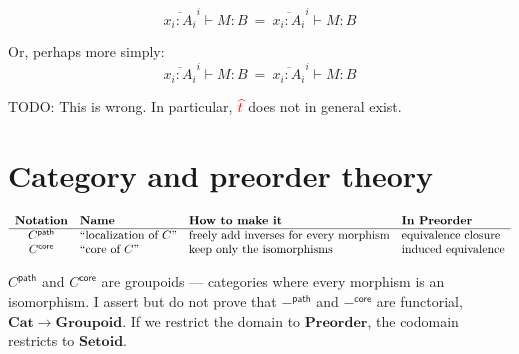 \documentclass{article}
\newcommand{\todo}[1]{{\color{red}#1}}
\newcommand{\ms}[1]{\ensuremath{\mathsf{#1}}}
\newcommand{\mb}[1]{\ensuremath{\mathbf{#1}}}
\newcommand{\iso}{\ms{core}}
\renewcommand{\path}{\ms{path}}
\newcommand{\tm}{{\ms{id}}}     %
\newcommand{\tc}{\cdot}         %
\newcommand{\h}[3]{#1 : {#2}}
\begin{document}
\newcommand{\tdual}[1]{{\color{red}{\widehat{#1}}}}

\begin{equation}
  \overline{\h{x_i}{A_i}{\hilited s_i}}^i \vdash \h{M}{B}{\hilited \tdual{t} \tc u}
  ~=~
  \overline{\h{x_i}{A_i}{\hilited s_i \tc t}}^i
  \vdash \h{M}{B}{\hilited u}
\end{equation}

Or, perhaps more simply:
\begin{equation}
  \overline{\h{x_i}{A_i}{\hilited s_i}}^i \vdash \h{M}{B}{\hilited \tdual{t}}
  ~=~
  \overline{\h{x_i}{A_i}{\hilited s_i \tc t}}^i
  \vdash \h{M}{B}{\hilited\tm}
\end{equation}

\todo{TODO: This is wrong. In particular, $\tdual{t}$ does not in general exist.}



\section{Category and preorder theory}

\[
\begin{array}{clll}
  \multicolumn{1}{l}{\textbf{Notation}}
  & \multicolumn{1}{l}{\textbf{Name}}
  & \multicolumn{1}{l}{\textbf{How to make it}}
  & \multicolumn{1}{l}{\textbf{In $\mb{Preorder}$}}
  \\\hline
  C^\path
  & \text{``localization of $C$''}
  & \text{freely add inverses for every morphism}
  & \text{equivalence closure}
  \\
  C^\iso
  & \text{``core of $C$''}
  & \text{keep only the isomorphisms}
  & \text{induced equivalence}
\end{array}
\]

$C^\path$ and $C^\iso$ are groupoids --- categories where every morphism is an
isomorphism. I assert but do not prove that $-^\path$ and $-^\iso$ are
functorial, $\mb{Cat} \to \mb{Groupoid}$. If we restrict the domain to
$\mb{Preorder}$, the codomain restricts to $\mb{Setoid}$.
\end{document}
